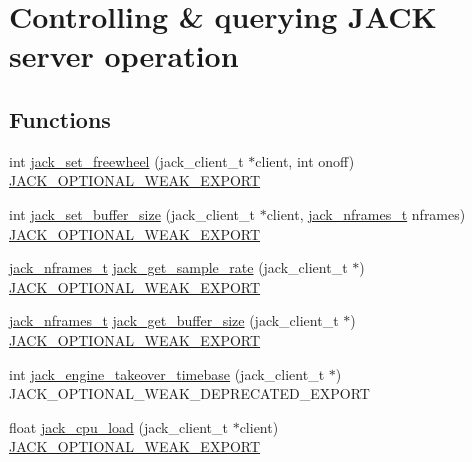 \hypertarget{group__ServerClientControl}{\section{\-Controlling \& querying \-J\-A\-C\-K server operation}
\label{d9/d51/group__ServerClientControl}
}
\subsection*{\-Functions}
\begin{DoxyCompactItemize}
\item 
int \hyperlink{group__ServerClientControl_gad65c741a1d1d2fb09efacf51437b841a}{jack\-\_\-set\-\_\-freewheel} (jack\-\_\-client\-\_\-t $\ast$client, int onoff) \hyperlink{weakmacros_8h_adf1bde0dd996bbf61a44311165014dd1}{\-J\-A\-C\-K\-\_\-\-O\-P\-T\-I\-O\-N\-A\-L\-\_\-\-W\-E\-A\-K\-\_\-\-E\-X\-P\-O\-R\-T}
\item 
int \hyperlink{group__ServerClientControl_gad96bda0901b924f5996e02e41a979685}{jack\-\_\-set\-\_\-buffer\-\_\-size} (jack\-\_\-client\-\_\-t $\ast$client, \hyperlink{types_8h_aa954df532e901ae5172e68a23f3da9b6}{jack\-\_\-nframes\-\_\-t} nframes) \hyperlink{weakmacros_8h_adf1bde0dd996bbf61a44311165014dd1}{\-J\-A\-C\-K\-\_\-\-O\-P\-T\-I\-O\-N\-A\-L\-\_\-\-W\-E\-A\-K\-\_\-\-E\-X\-P\-O\-R\-T}
\item 
\hyperlink{types_8h_aa954df532e901ae5172e68a23f3da9b6}{jack\-\_\-nframes\-\_\-t} \hyperlink{group__ServerClientControl_ga62022d4f2fbfba065f0874a497afd3b4}{jack\-\_\-get\-\_\-sample\-\_\-rate} (jack\-\_\-client\-\_\-t $\ast$) \hyperlink{weakmacros_8h_adf1bde0dd996bbf61a44311165014dd1}{\-J\-A\-C\-K\-\_\-\-O\-P\-T\-I\-O\-N\-A\-L\-\_\-\-W\-E\-A\-K\-\_\-\-E\-X\-P\-O\-R\-T}
\item 
\hyperlink{types_8h_aa954df532e901ae5172e68a23f3da9b6}{jack\-\_\-nframes\-\_\-t} \hyperlink{group__ServerClientControl_gad1f5972836af7e72e6d79ed6bc53916f}{jack\-\_\-get\-\_\-buffer\-\_\-size} (jack\-\_\-client\-\_\-t $\ast$) \hyperlink{weakmacros_8h_adf1bde0dd996bbf61a44311165014dd1}{\-J\-A\-C\-K\-\_\-\-O\-P\-T\-I\-O\-N\-A\-L\-\_\-\-W\-E\-A\-K\-\_\-\-E\-X\-P\-O\-R\-T}
\item 
int \hyperlink{group__ServerClientControl_ga2db0a4e9ab7b6d9984e91abba27ab71d}{jack\-\_\-engine\-\_\-takeover\-\_\-timebase} (jack\-\_\-client\-\_\-t $\ast$) \-J\-A\-C\-K\-\_\-\-O\-P\-T\-I\-O\-N\-A\-L\-\_\-\-W\-E\-A\-K\-\_\-\-D\-E\-P\-R\-E\-C\-A\-T\-E\-D\-\_\-\-E\-X\-P\-O\-R\-T
\item 
float \hyperlink{group__ServerClientControl_ga9136d56397ad4f394a8b169462f5683b}{jack\-\_\-cpu\-\_\-load} (jack\-\_\-client\-\_\-t $\ast$client) \hyperlink{weakmacros_8h_adf1bde0dd996bbf61a44311165014dd1}{\-J\-A\-C\-K\-\_\-\-O\-P\-T\-I\-O\-N\-A\-L\-\_\-\-W\-E\-A\-K\-\_\-\-E\-X\-P\-O\-R\-T}
\end{DoxyCompactItemize}


